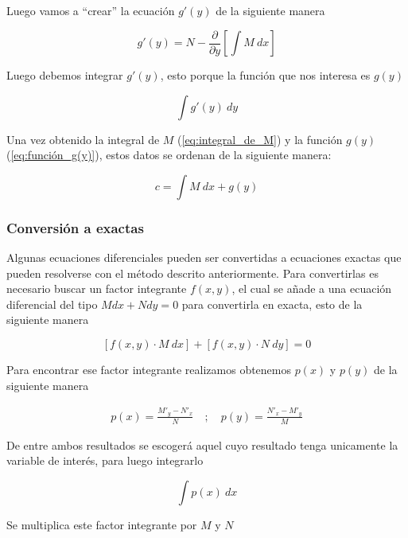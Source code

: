 Luego vamos a ``crear'' la ecuación $g'(y)$ de la siguiente manera

\begin{equation*}
    g'(y)=N-\frac{\partial}{\partial y}\left[ \int{M \ dx} \right]
\end{equation*}

Luego debemos integrar $g'(y)$, esto porque la función que nos interesa es $g(y)$ 

\begin{equation}\label{eq:función_g(y)}
    \int {g'(y) \ dy}
\end{equation}

Una vez obtenido la integral de $M$ (\autoref{eq:integral_de_M}) y la función $g(y)$ (\autoref{eq:función_g(y)}), estos datos se ordenan de la siguiente manera:

\begin{equation}
    c=\int{M \ dx} + g(y)
\end{equation}

\subsubsection{Conversión a exactas}

Algunas ecuaciones diferenciales pueden ser convertidas a ecuaciones exactas que pueden resolverse con el método descrito anteriormente. Para convertirlas es necesario buscar un factor integrante $f(x,y)$, el cual se añade a una ecuación diferencial del tipo $Mdx+Ndy=0$ para convertirla en exacta, esto de la siguiente manera

\begin{equation*}
    \left[ f(x,y) \cdot M \ dx \right] + \left[ f(x,y) \cdot N \ dy \right] = 0
\end{equation*}

Para encontrar ese factor integrante realizamos obtenemos $p(x)$ y $p(y)$ de la siguiente manera

\begin{align*}
    p(x) = \frac{M'_{y}-N'_{x}}{N} \quad ; \quad p(y) = \frac{N'_{x}-M'_{y}}{M}
\end{align*}

De entre ambos resultados se escogerá aquel cuyo resultado tenga unicamente la variable de interés, para luego integrarlo

\begin{equation*}
    \int{p(x) \ dx}
\end{equation*}

Se multiplica este factor integrante por $M$ y $N$ 

